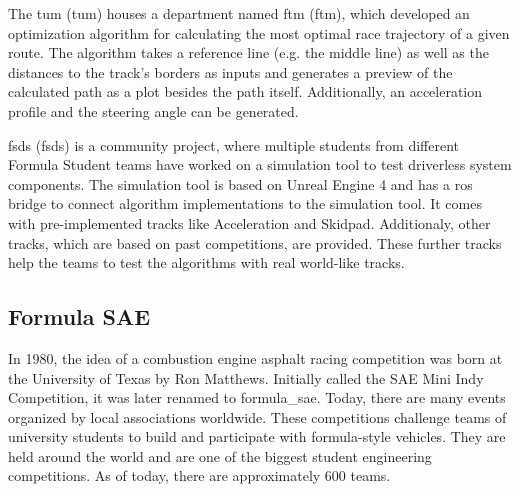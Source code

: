 The \acrlong{tum} (\acrshort{tum}) houses a department named \acrlong{ftm} (\acrshort{ftm}), which developed an optimization algorithm for calculating the most optimal race trajectory of a given route. The algorithm takes a reference line (e.g. the middle line) as well as the distances to the track's borders as inputs and generates a preview of the calculated path as a plot besides the path itself. Additionally, an acceleration profile and the steering angle can be generated.
\cite{tumftm_optimization_algoritm}

\acrshort{fsds} (\acrlong{fsds}) is a community project, where multiple students from different Formula Student teams have worked on a simulation tool to test driverless system components. The simulation tool is based on Unreal Engine 4 \cite{unreal_engine} and has a \acrshort{ros} bridge to connect algorithm implementations to the simulation tool. It comes with pre-implemented tracks like Acceleration and Skidpad. Additionaly, other tracks, which are based on past competitions, are provided. These further tracks help the teams to test the algorithms with real world-like tracks.
\cite{fsds_github}

\subsection{Formula SAE}
In 1980, the idea of a combustion engine asphalt racing competition was born at the University of Texas by Ron Matthews. Initially called the SAE Mini Indy Competition, it was later renamed to \Gls{formula_sae}. Today, there are many events organized by local associations worldwide.
\cite{formula_sae}
These competitions challenge teams of university students to build and participate with formula-style vehicles. They are held around the world and are one of the biggest student engineering competitions. As of today, there are approximately 600 teams. \cite{sae_student_events}

